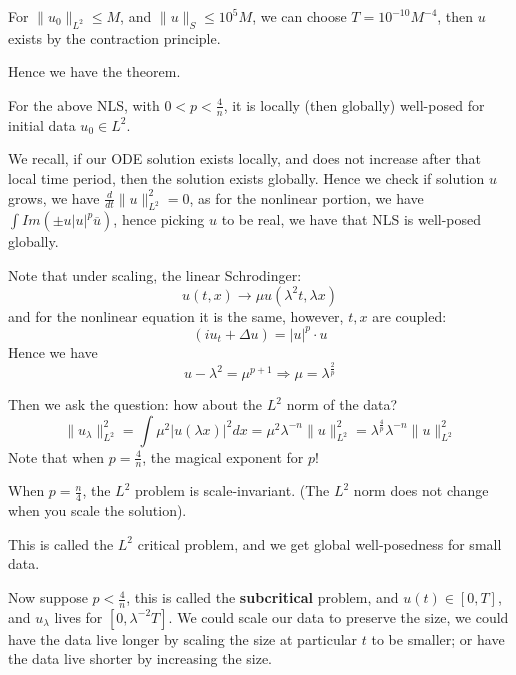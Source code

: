 \begin{corollary}
    For $\|u_0\|_{L^2}\leq M$, and $\|u\|_S\leq 10^5M$, we can choose $T=10^{-10}M^{-4}$, then $u$ exists by the contraction principle.
\end{corollary}

Hence we have the theorem.
\begin{theorem}
    For the above NLS, with $0<p<\frac{4}{n}$, it is locally (then globally) well-posed for initial data $u_0\in L^2$. 
\end{theorem}
\begin{remark}
    We recall, if our ODE solution exists locally, and does not increase after that local time period, then the solution exists globally. Hence we check if solution $u$ grows, we have $\frac{d}{dt}\|u\|_{L^2}^2=0$, as for the nonlinear portion, we have $\int Im(\pm u|u|^p\overline{u})$, hence picking $u$ to be real, we have that NLS is well-posed globally.
\end{remark}

Note that under scaling, the linear Schrodinger:
\begin{equation*}
    u(t,x)\to\mu u(\lambda^2t, \lambda x)
\end{equation*}
and for the nonlinear equation it is the same, however, $t,x$ are coupled:
\begin{equation*}
    (iu_t+\Delta u)=|u|^p\cdot u
\end{equation*}
Hence we have
\begin{equation*}
    u-\lambda^2=\mu^{p+1}\Rightarrow \mu=\lambda^\frac{2}{p}
\end{equation*}

Then we ask the question: how about the $L^2$ norm of the data?
\begin{equation*}
    \|u_\lambda\|_{L^2}^2=\int\mu^2|u(\lambda x)|^2dx=\mu^2\lambda^{-n}\|u\|_{L^2}^2=\lambda^\frac{4}{p}\lambda^{-n}\|u\|_{L^2}^2
\end{equation*}
Note that when $p=\frac{4}{n}$, the magical exponent for $p$!
\begin{corollary}[$L^2$ critical]
    When $p=\frac{n}{4}$, the $L^2$ problem is scale-invariant. (The $L^2$ norm does not change when you scale the solution). 

    This is called the $L^2$ critical problem, and we get global well-posedness for small data.
\end{corollary}

Now suppose $p<\frac{4}{n}$, this is called the \textbf{subcritical} problem, and $u(t)\in [0,T]$, and $u_\lambda$ lives for $[0,\lambda^{-2}T]$. We could scale our data to preserve the size, we could have the data live longer by scaling the size at particular $t$ to be smaller; or have the data live shorter by increasing the size.

